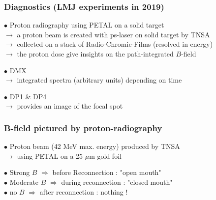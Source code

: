 \documentclass{beamer}
\begin{document}
\begin{frame}
\frametitle{Diagnostics (LMJ experiments in 2019)}

$\bullet$ Proton radiography using PETAL on a solid target \\
$\to$ a proton beam is created with ps-laser on solid target by TNSA \\
$\to$ collected on a stack of Radio-Chromic-Films (resolved in energy) \\
$\to$ the proton dose give insights on the path-integrated $B$-field \\

\bigskip
\bigskip

$\bullet$ DMX \\
$\to$ integrated spectra (arbitrary units) depending on time \\

\bigskip
\bigskip

$\bullet$ DP1 \& DP4 \\
$\to$ provides an image of the focal spot \\


\end{frame}



\begin{frame}
\frametitle{B-field pictured by proton-radiography}

$\bullet$ Proton beam (42 MeV max. energy) produced by TNSA \\
$\to$ using PETAL on a 25 $\mu$m gold foil



$\bullet$ Strong $B$ $\Rightarrow$ before Reconnection : "open mouth" \\
$\bullet$ Moderate $B$ $\Rightarrow$ during reconnection : "closed mouth" \\
$\bullet$ no $B$ $\Rightarrow$ after reconnection : nothing ! \\

\end{frame}
\end{document}
